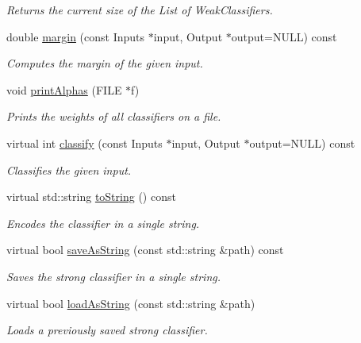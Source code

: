 \begin{DoxyCompactItemize}
\begin{DoxyCompactList}\small\item\em Returns the current size of the List of Weak\+Classifiers. \end{DoxyCompactList}\item 
double \hyperlink{classiCub_1_1boostMIL_1_1StrongClassifier_acd33ed5cc98ed84a61e27b41eec63c5c}{margin} (const Inputs $\ast$input, Output $\ast$output=N\+U\+L\+L) const 
\begin{DoxyCompactList}\small\item\em Computes the margin of the given input. \end{DoxyCompactList}\item 
void \hyperlink{classiCub_1_1boostMIL_1_1StrongClassifier_acdfb5551c7b9315ab4077566809064fc}{print\+Alphas} (F\+I\+L\+E $\ast$f)
\begin{DoxyCompactList}\small\item\em Prints the weights of all classifiers on a file. \end{DoxyCompactList}\item 
virtual int \hyperlink{classiCub_1_1boostMIL_1_1StrongClassifier_a1fee2d421c908292846b6e7356c7c6d1}{classify} (const Inputs $\ast$input, Output $\ast$output=N\+U\+L\+L) const 
\begin{DoxyCompactList}\small\item\em Classifies the given input. \end{DoxyCompactList}\item 
virtual std\+::string \hyperlink{classiCub_1_1boostMIL_1_1StrongClassifier_adb838aab38a5503330b4335c2b4d7a0f}{to\+String} () const 
\begin{DoxyCompactList}\small\item\em Encodes the classifier in a single string. \end{DoxyCompactList}\item 
virtual bool \hyperlink{classiCub_1_1boostMIL_1_1StrongClassifier_ab92075af6f373b770f723e1289fca780}{save\+As\+String} (const std\+::string \&path) const 
\begin{DoxyCompactList}\small\item\em Saves the strong classifier in a single string. \end{DoxyCompactList}\item 
virtual bool \hyperlink{classiCub_1_1boostMIL_1_1StrongClassifier_aa3dafb8b823e28e200ce97ec81676667}{load\+As\+String} (const std\+::string \&path)
\begin{DoxyCompactList}\small\item\em Loads a previously saved strong classifier. \end{DoxyCompactList}\item 

\end{DoxyCompactItemize}
